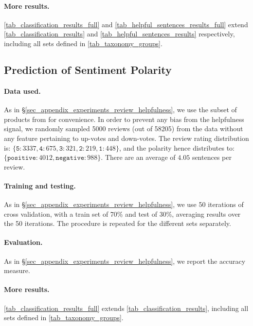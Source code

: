\paragraph{More results.}
\autoref{tab_classification_results_full} and \autoref{tab_helpful_sentences_results_full} extend \autoref{tab_classification_results} and \autoref{tab_helpful_sentences_results} respectively, including all \taxtype{} sets defined in \autoref{tab_taxonomy_groups}.



\subsection{Prediction of Sentiment Polarity}
\label{sec_appendix_experiments_sentiment}

\paragraph{Data used.}
As in \S{\ref{sec_appendix_experiments_review_helpfulness}}, we use the subset of products from \citet{gamzu2021helpfulsentences} for convenience. In order to prevent any bias from the helpfulness signal, we randomly sampled 5000 reviews (out of 58205) from the data without any feature pertaining to up-votes and down-votes. The review rating distribution is: $\{\texttt{5}: 3337, \texttt{4}: 675, \texttt{3}: 321, \texttt{2}: 219, \texttt{1}: 448\}$, and the polarity hence distributes to: $\{\texttt{positive}: 4012, \texttt{negative}: 988\}$. There are an average of $4.05$ sentences per review.

\paragraph{Training and testing.}
As in \S\ref{sec_appendix_experiments_review_helpfulness}, we use 50 iterations of cross validation, with a train set of 70\% and test of 30\%, averaging results over the 50 iterations. The procedure is repeated for the different \taxtype{} sets separately.

\paragraph{Evaluation.}
As in \S\ref{sec_appendix_experiments_review_helpfulness}, we report the accuracy measure.

\paragraph{More results.}
\autoref{tab_classification_results_full} extends \autoref{tab_classification_results}, including all \taxtype{} sets defined in \autoref{tab_taxonomy_groups}.



